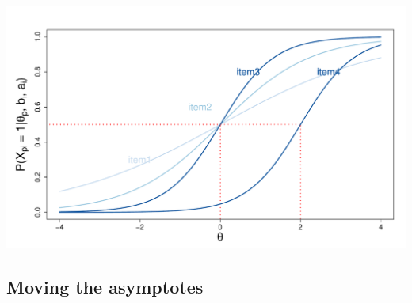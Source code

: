 \documentclass[aspectratio=149, compress]{beamer}
\begin{document}
\begin{frame}
	\centering
	\includegraphics[width=.8\linewidth]{img/ICC-2pl.pdf}
	
\end{frame}

\subsection*{Moving the asymptotes}
\end{document}
